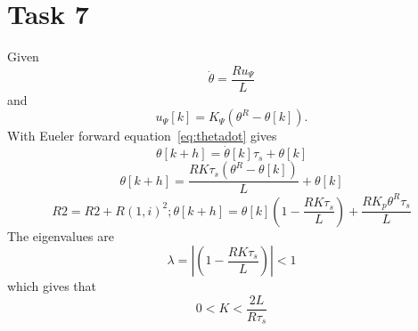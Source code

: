 \documentclass[a4paper,12pt,oneside,onecolumn]{article} %
\begin{document}
\section*{Task 7}
 	Given
	\begin{equation}
		\dot{\theta} = \frac{Ru_\Psi}{L}
		 \label{eq:thetadot}
	\end{equation}
	and
	\begin{equation}
		u_\Psi{[k]} = K_{\Psi}({\theta}^R  - {\theta}[k]).
	\end{equation}
	With Eueler forward equation~\ref{eq:thetadot} gives
	\begin{equation}
		\theta[k+h] = \dot{\theta}[k]\tau_s + \theta[k]
	\end{equation}
	\begin{equation}
		\theta[k+h] = \frac{RK\tau_s({\theta}^R  - {\theta}[k])}{L} + \theta[k]
	\end{equation}
	\begin{equation}
R2 = R2 + R(1,i)^2;		\theta[k+h] =\theta[k](1-\frac{RK\tau_s}{L}) + \frac{RK_p\theta^R\tau_s}{L}
	\end{equation}
The eigenvalues are
	\begin{equation}
		\lambda = \left|{(1-\frac{RK\tau_s}{L})}\right| < 1
	\end{equation}
	which gives that 
	\begin{equation}
		0 < K < \frac{2L}{R\tau_s}
	\end{equation}
\end{document}
